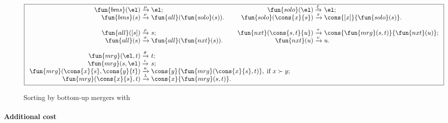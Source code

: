 \begin{figure}
\begin{equation*}
\boxed{%
\begin{array}{r@{\;}l@{\;}lr@{\;}l@{\;}l}
  \fun{bms}(\el) & \xrightarrow{\smash{\mu}} & \el;
& \fun{solo}(\el) & \xrightarrow{\smash{\xi}} & \el;\\
  \fun{bms}(s) & \xrightarrow{\smash{\nu}}
               & \fun{all}(\fun{solo}(s)).
& \fun{solo}(\cons{x}{s}) & \xrightarrow{\smash{\pi}}
                          & \cons{[x]}{\fun{solo}(s)}.\\
\\
  \fun{all}([s]) & \xrightarrow{\smash{\rho}} & s;
& \fun{nxt}(\cons{s,t}{u}) & \xrightarrow{\smash{\tau}}
                         & \cons{\fun{mrg}(s,t)}{\fun{nxt}(u)};\\
  \fun{all}(s) & \xrightarrow{\smash{\sigma}}
               & \fun{all}(\fun{nxt}(s)).
& \fun{nxt}(u) & \xrightarrow{\smash{\upsilon}} & u.\\
\\
\fun{mrg}(\el,t)         & \xrightarrow{\smash{\theta}} & t;\\
\fun{mrg}(s,\el)         & \xrightarrow{\smash{\iota}} & s;\\
\fun{mrg}(\cons{x}{s},\cons{y}{t}) & \xrightarrow{\smash{\kappa}}
& \multicolumn{4}{@{}l}{\cons{y}{\fun{mrg}(\cons{x}{s},t)},
\;\text{if \(x \succ y\);}}\\
\fun{mrg}(\cons{x}{s},t) & \xrightarrow{\smash{\lambda}}
                         & \cons{x}{\fun{mrg}(s,t)}.
\end{array}}
\end{equation*}
\caption{Sorting by bottom-up mergers with }
\label{fig:bms}
\end{figure}


\paragraph{Additional cost}

